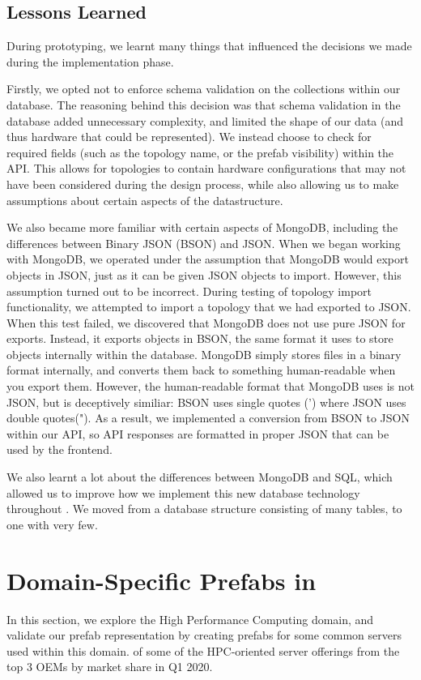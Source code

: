 \documentclass[11pt]{article}
\begin{document}
	\subsection{Lessons Learned}
		During prototyping, we learnt many things that influenced the decisions we made during the implementation phase.

		Firstly, we opted not to enforce schema validation on the collections within our database.
		The reasoning behind this decision was that schema validation in the database added unnecessary complexity, and limited the shape of our data (and thus hardware that could be represented).
		We instead choose to check for required fields (such as the topology name, or the prefab visibility) within the API.
		This allows for topologies to contain hardware configurations that may not have been considered during the design process, while also allowing us to make assumptions about certain aspects of the datastructure.

		We also became more familiar with certain aspects of MongoDB, including the differences between Binary JSON (BSON) and JSON.
		When we began working with MongoDB, we operated under the assumption that MongoDB would export objects in JSON, just as it can be given JSON objects to import.
		However, this assumption turned out to be incorrect. 
		During testing of topology import functionality, we attempted to import a topology that we had exported to JSON.
		When this test failed, we discovered that MongoDB does not use pure JSON for exports.
		Instead, it exports objects in BSON, the same format it uses to store objects internally within the database.
		MongoDB simply stores files in a binary format internally, and converts them back to something human-readable when you export them. 
		However, the human-readable format that MongoDB uses is not JSON, but is deceptively similiar: BSON uses single quotes (') where JSON uses double quotes(").
		As a result, we implemented a conversion from BSON to JSON within our API, so API responses are formatted in proper JSON that can be used by the frontend.

		We also learnt a lot about the differences between MongoDB and SQL, which allowed us to improve how we implement this new database technology throughout \opendc{}.
		We moved from a database structure consisting of many tables, to one with very few.


\newpage

\section{Domain-Specific Prefabs in \opendc{}}
	In this section, we explore the High Performance Computing domain, and validate our prefab representation by creating prefabs for some common servers used within this domain. of some of the HPC-oriented server offerings from the top 3 OEMs by market share in Q1 2020.
	
\end{document}
